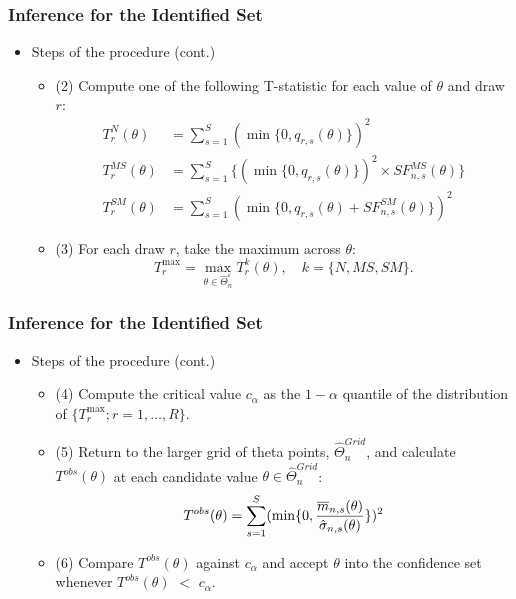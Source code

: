 \documentclass[10pt,letterpaper]{beamer}
\begin{document}

\begin{frame}
\frametitle{Inference for the Identified Set}

\begin{itemize}
\item Steps of the procedure (cont.) 

\begin{itemize}
\item (2) Compute one of the following T-statistic for each value of $\theta 
$ and draw $r$: 
\begin{equation*}
\begin{split}
T_{r}^{N}(\theta )& =\sum_{s=1}^{S}(\min \{0,q_{r,s}(\theta )\})^{2} \\
T_{r}^{MS}(\theta )& =\sum_{s=1}^{S}\{(\min \{0,q_{r,s}(\theta
)\})^{2}\times SF_{n,s}^{MS}(\theta )\} \\
T_{r}^{SM}(\theta )& =\sum_{s=1}^{S}(\min \{0,q_{r,s}(\theta
)+SF_{n,s}^{SM}(\theta )\})^{2}
\end{split}%
\end{equation*}

\item (3) For each draw $r$, take the maximum across $\theta $: 
\begin{equation*}
T_{r}^{\max }=\max_{\theta \in \widehat{\Theta }_{n}^{\varepsilon
}}T_{r}^{k}(\theta ),\quad k=\{N,MS,SM\}.
\end{equation*}
\end{itemize}
\end{itemize}
\end{frame}


\begin{frame}
\frametitle{Inference for the Identified Set}

\begin{itemize}
\item Steps of the procedure (cont.) 

\begin{itemize}
\item (4) Compute the critical value $c_{\alpha}$ as the $1-\alpha$ quantile
of the distribution of $\{T^{\max}_{r}; r=1,\dots,R\}$. 

\item (5) Return to the larger grid of theta points, $\widehat{\Theta }%
_{n}^{Grid}$, and calculate $T^{obs}(\theta )$ at each candidate value $%
\theta \in \widehat{\Theta }_{n}^{Grid}$: 
\begin{equation*}
T^{obs}(\theta )=\sum_{s=1}^{S}(\min \{0,\frac{\overline{m}_{n,s}(\theta )}{%
\hat{\sigma}_{n,s}(\theta )}\})^{2}
\end{equation*}

\item (6) Compare $T^{obs}(\theta)$ against $c_{\alpha}$ and accept $\theta$
into the confidence set whenever $T^{obs}(\theta)$ $<$ $c_{\alpha}$. 
\end{itemize}
\end{itemize}
\end{frame}
\end{document}
